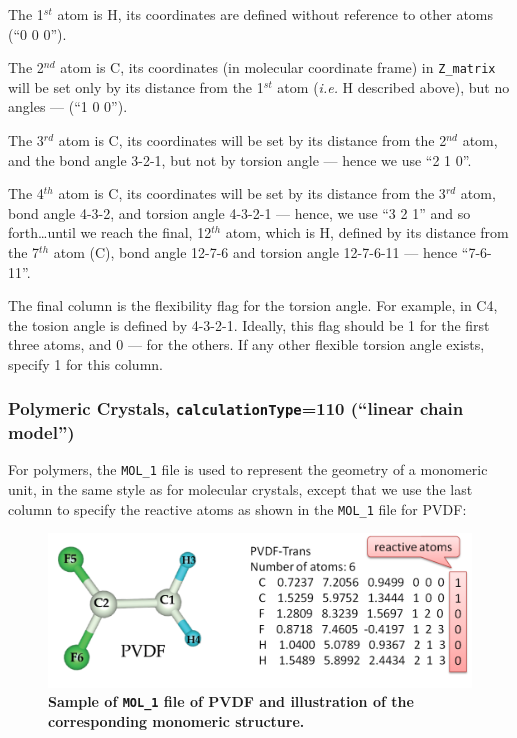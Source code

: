 \documentclass[12pt]{article}
\newcommand{\keyword}[1]{\texttt{#1}}
\newcommand{\file}[1]{\texttt{#1}}
\begin{document}
The 1$^{st}$ atom is H, its coordinates are defined without reference to other
atoms (``0 0 0'').

The 2$^{nd}$ atom is C, its coordinates (in molecular coordinate frame) in
\file{Z\_matrix} will be set only by its distance from the 1$^{st}$ atom
(\emph{i.e.} H described above), but no angles --- (``1 0 0'').

The 3$^{rd}$ atom is C, its coordinates will be set by its distance from the
2$^{nd}$ atom, and the bond angle 3-2-1, but not by torsion angle --- hence we
use ``2 1 0''.

The 4$^{th}$ atom is C, its coordinates will be set by its distance from the
3$^{rd}$ atom, bond angle 4-3-2, and torsion angle 4-3-2-1 --- hence, we use
``3 2 1'' and so forth\ldots until we reach the final, 12$^{th}$ atom, which is
H, defined by its distance from the 7$^{th}$ atom (C), bond angle 12-7-6 and
torsion angle 12-7-6-11 --- hence ``7-6-11''.

The final column is the flexibility flag for the torsion angle. For example, in
C4, the tosion angle is defined by 4-3-2-1. Ideally, this flag should be 1 for
the first three atoms, and 0 --- for the others. If any other flexible torsion
angle exists, specify 1 for this column.


\subsubsection{Polymeric Crystals, \keyword{calculationType}=110 (``linear
chain model'')}

For polymers, the \file{MOL\_1} file is used to represent the geometry of a
monomeric unit, in the same style as for molecular crystals, except that we use
the last column to specify the reactive atoms as shown in the \file{MOL\_1} file
for PVDF:

\begin{figure}[htbp] \centering 
\includegraphics[scale=0.72]{pic/PVDF_MOL}
\caption{\footnotesize \textbf{Sample of \file{MOL\_1} file of PVDF and
illustration of the corresponding monomeric structure.}}
\label{fig:pvdf}
\end{figure}
\end{document}
